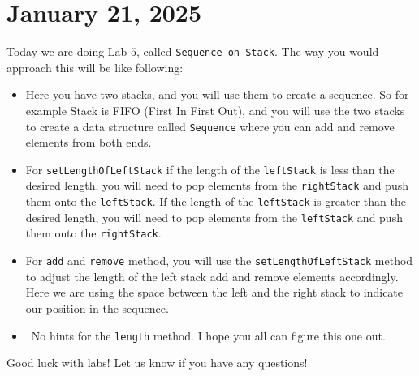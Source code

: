 \documentclass[11pt]{article}
\begin{document}
\section{January 21, 2025}
Today we are doing Lab \(5\), called \texttt{Sequence on Stack}. The way you
would approach this will be like following:
\begin{itemize}
    \item Here you have two stacks, and you will use them to create a sequence. So for
          example Stack is FIFO (First In First Out), and you will use the two stacks to
          create a data structure called \texttt{Sequence} where you can add and remove
          elements from both ends.
    \item For \texttt{setLengthOfLeftStack} if the length of the \texttt{leftStack} is
          less than the desired length, you will need to pop elements from the
          \texttt{rightStack} and push them onto the \texttt{leftStack}. If the length of
          the \texttt{leftStack} is greater than the desired length, you will need to pop
          elements from the \texttt{leftStack} and push them onto the
          \texttt{rightStack}.

    \item For \texttt{add} and \texttt{remove} method, you will use the \texttt{setLengthOfLeftStack} method to adjust the length of the left stack add and remove elements accordingly. Here we are using the space between the left and the right stack to indicate our position in the sequence. 
    \item\ No hints for the \texttt{length} method. I hope you all can figure this one out. 
\end{itemize}

Good luck with labs! Let us know if you have any questions!
\end{document}
